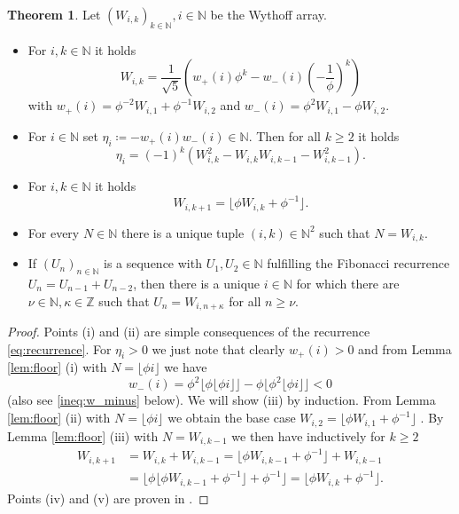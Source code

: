\documentclass[]{interact}
\newcommand{\bbN}{\mathbb{N}}
\newcommand{\bbZ}{\mathbb{Z}}
\theoremstyle{definition}
\newtheorem{thm}{Theorem}[section]
\numberwithin{table}{section} %
\numberwithin{figure}{section}
\begin{document}
\begin{thm} \label{thm:wythoff_basics}
    Let $(W_{i, k})_{k \in \bbN}, i \in \bbN$ be the Wythoff array.
    \begin{itemize}
        \item [(i)] For $i, k \in\bbN$ it holds
        $$
        W_{i, k} = \frac1{\sqrt5} \left(w_+(i) \phi^k - w_-(i) \left(-\frac1\phi\right)^k \right)
        $$
        with $w_+(i) = \phi^{-2} W_{i, 1} + \phi^{-1} W_{i, 2}$ and $w_-(i) = \phi^2 W_{i, 1} - \phi W_{i, 2}$.

        \item [(ii)] For $i \in \bbN$ set $\eta_i \coloneqq -w_+(i) w_-(i) \in \bbN$. Then for all $k \geq 2$ it holds
        $$
        \eta_i = (-1)^k \left(W_{i, k}^2 - W_{i, k} W_{i, k-1} - W_{i, k-1}^2\right).
        $$

        \item[(iii)] For $i, k \in \bbN$ it holds
        $$
        W_{i, k+1} = \lfloor \phi W_{i, k} + \phi^{-1}\rfloor.
        $$

        \item [(iv)] For every $N \in \bbN$ there is a unique tuple $(i, k) \in \bbN^2$ such that $N = W_{i, k}$.

        \item [(v)] If $(U_n)_{n \in \bbN}$ is a sequence with $U_1, U_2 \in \bbN$ fulfilling the Fibonacci recurrence $U_n = U_{n-1}+U_{n-2}$, then there is a unique $i \in \bbN$ for which there are $\nu \in \bbN, \kappa \in \bbZ$ such that $U_n = W_{i, n+\kappa}$ for all $n \geq \nu$.
    \end{itemize}
\end{thm}
\begin{proof}
    Points (i) and (ii) are simple consequences of the recurrence \eqref{eq:recurrence}. For $\eta_i > 0$ we just note that clearly $w_+(i) > 0$ and from Lemma \ref{lem:floor} (i) with $N = \lfloor \phi i \rfloor$ we have
    $$
    w_-(i) = \phi^2 \lfloor \phi \lfloor \phi i\rfloor\rfloor - \phi \lfloor \phi^2 \lfloor \phi i\rfloor\rfloor < 0
    $$
    (also see \eqref{ineq:w_minus} below). We will show (iii) by induction. From Lemma \ref{lem:floor} (ii) with $N = \lfloor \phi i\rfloor$ we obtain the base case $W_{i, 2} = \lfloor \phi W_{i, 1} + \phi^{-1}\rfloor$ . By Lemma \ref{lem:floor} (iii) with $N = W_{i, k-1}$ we then have inductively for $k \geq 2$
    \begin{align*}
        W_{i, k+1} & = W_{i, k} + W_{i, k-1} = \lfloor \phi W_{i, k-1} + \phi^{-1}\rfloor + W_{i, k-1} \\
        & = \lfloor \phi \lfloor \phi W_{i, k-1} + \phi^{-1}\rfloor + \phi^{-1}\rfloor = \lfloor \phi W_{i, k} + \phi^{-1}\rfloor.
    \end{align*}
    Points (iv) and (v) are proven in \cite{Mor80}.
\end{proof}
\end{document}
